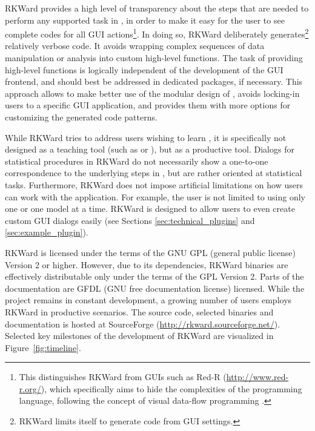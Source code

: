 RKWard provides a high level of transparency about the steps that are needed to
perform any supported task in , in order to make it easy for the user to see
complete codes for all GUI actions\footnote{
  This distinguishes RKWard from  GUIs such as Red-R (\url{http://www.red-r.org/}), which 
  specifically aims to hide the complexities of the  programming language, following the concept of visual data-flow 
  programming \citep{Sutherland1966}.
}. In doing so, RKWard deliberately generates\footnote{
  RKWard limits itself to generate  code from GUI settings.
} relatively verbose code. It avoids wrapping complex sequences of data
manipulation or analysis into custom high-level  functions. The task of
providing high-level functions is logically independent of the development of the
GUI frontend, and should best be addressed in dedicated  packages, if necessary.
This approach allows to make better use of the modular design of , avoids
locking-in users to a specific GUI application, and provides them with more options for
customizing the generated code patterns.

While RKWard tries to address users wishing to learn , it is specifically not
designed as a teaching tool (such as  or ), but as
a productive tool. Dialogs for statistical procedures in RKWard do not
necessarily show a one-to-one correspondence to the underlying steps in , but are
rather oriented at statistical tasks. Furthermore, RKWard does not impose
artificial limitations on how users can work with the application. For example,
the user is not limited to using only one  or one model at a
time. RKWard is designed to allow users to even create custom GUI dialogs
easily (see Sections \ref{sec:technical_plugins} and \ref{sec:example_plugin}).

RKWard is licensed under the terms of the GNU GPL (general public license) Version 2
or higher. However, due to its dependencies, RKWard binaries are effectively
distributable only under the terms of the GPL Version 2. Parts of the documentation are
GFDL (GNU free documentation license) licensed. While the project remains in constant development, a growing
number of users employs RKWard in productive scenarios. The source code,
selected binaries and documentation is hosted at SourceForge
(\url{http://rkward.sourceforge.net/}). Selected key milestones of the development of RKWard are
visualized in Figure~\ref{fig:timeline}.

